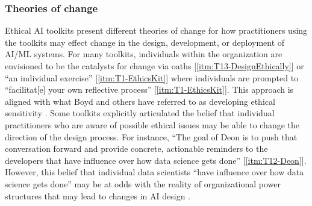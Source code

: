 \documentclass[acmsmall]{acmart}
\begin{document}
\subsubsection{Theories of change}
Ethical AI toolkits present different theories of change for how practitioners using the toolkits may effect change in the design, development, or deployment of AI/ML systems. 
For many toolkits, individuals within the organization %
are envisioned to be the catalysts for change
via oaths [\ref{itm:T13-DesignEthically}] or ``an individual exercise'' [\ref{itm:T1-EthicsKit}] where individuals are prompted to ``facilitat[e] your own reflective process'' [\ref{itm:T1-EthicsKit}]. This approach is aligned with what  Boyd and others have referred to as developing ethical sensitivity \cite{boyd2020ethical,weaver2008ethical}. Some toolkits explicitly articulated the belief that individual practitioners who are aware of possible ethical issues may be able to change the direction of the design process. For instance, ``The goal of Deon is to push that conversation forward and provide concrete, actionable reminders to the developers that have influence over how data science gets done'' [\ref{itm:T12-Deon}]. However, this belief that individual data scientists ``have influence over how data science gets done'' may be at odds with the reality of organizational power structures that may lead to changes in AI design \cite[cf.][]{rakova2021responsible}.  
 
\end{document}
